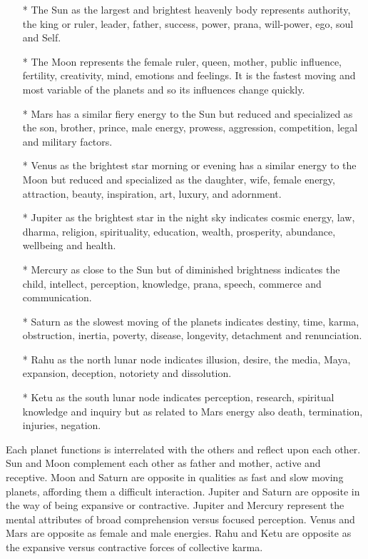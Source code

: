 \begin{enumerate}
\item[*] The Sun as the largest and brightest heavenly body represents authority, the king or ruler, leader, father, success, power, prana, will-power, ego, soul and Self.
\item[*] The Moon represents the female ruler, queen, mother, public influence, fertility, creativity, mind, emotions and feelings. It is the fastest moving and most variable of the planets and so its influences change quickly.
\item[*] Mars has a similar fiery energy to the Sun but reduced and specialized as the son, brother, prince, male energy, prowess, aggression, competition, legal and military factors.
\item[*] Venus as the brightest star morning or evening has a similar energy to the Moon but reduced and specialized as the daughter, wife, female energy, attraction, beauty, inspiration, art, luxury, and adornment.
\item[*] Jupiter as the brightest star in the night sky indicates cosmic energy, law, dharma, religion, spirituality, education, wealth, prosperity, abundance, wellbeing and health.
\item[*] Mercury as close to the Sun but of diminished brightness indicates the child, intellect, perception, knowledge, prana, speech, commerce and communication.
\item[*] Saturn as the slowest moving of the planets indicates destiny, time, karma, obstruction, inertia, poverty, disease, longevity, detachment and renunciation.
\item[*] Rahu as the north lunar node indicates illusion, desire, the media, Maya, expansion, deception, notoriety and dissolution.
\item[*] Ketu as the south lunar node indicates perception, research, spiritual knowledge and inquiry but as related to Mars energy also death, termination, injuries, negation.
\end{enumerate}

Each planet functions is interrelated with the others and reflect upon each other. Sun and Moon complement each other as father and mother, active and receptive. Moon and Saturn are opposite in qualities as fast and slow moving planets, affording them a difficult interaction. Jupiter and Saturn are opposite in the way of being expansive or contractive. Jupiter and Mercury represent the mental attributes of broad comprehension versus focused perception. Venus and Mars are opposite as female and male energies. Rahu and Ketu are opposite as the expansive versus contractive forces of collective karma.

